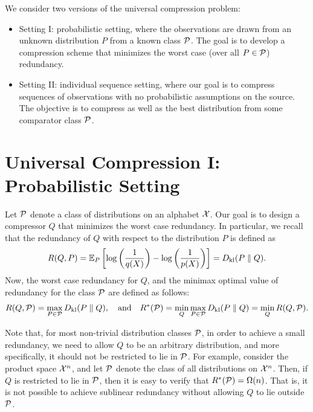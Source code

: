 
We consider two versions of the universal compression problem: 
\begin{itemize}
    \item Setting I: probabilistic setting, where the observations are drawn from an unknown distribution $P$ from a known class $\mathcal{P}$. The goal is to develop a compression scheme that minimizes the worst case (over all $P \in \mathcal{P}$) redundancy. 
    \item Setting II: individual sequence setting, where our goal is to compress sequences of observations with no probabilistic assumptions on the source. The objective is to compress as well as the best distribution  from some comparator class $\mathcal{P}$. 
\end{itemize}

\section{Universal Compression I: Probabilistic Setting}
\label{sec:universal-compression-probabilistic}
    Let $\mathcal{P}$ denote a class of distributions on an alphabet $\mathcal{X}$. Our goal is to design a compressor $Q$ that minimizes the worst case redundancy. In particular, we recall that the redundancy of $Q$ with respect to the distribution $P$ is defined as  
    \begin{align}
        R(Q, P) = \mathbb{E}_P \left[ \log \left( \frac{1}{q(X)} \right) - \log \left( \frac{1}{p(X)} \right) \right] = D_{\text{kl}}(P \parallel Q). 
    \end{align}
    Now, the worst case redundancy for $Q$, and the minimax optimal value of redundancy for the class $\mathcal{P}$ are defined as follows: 
    \begin{align}
        R(Q, \mathcal{P}) = \max_{P \in \mathcal{P}} D_{\text{kl}}(P \parallel Q), \quad \text{and} \quad R^*(\mathcal{P}) = \min_{Q} \max_{P \in \mathcal{P}} D_{\text{kl}}(P \parallel Q) = \min_{Q} R(Q, \mathcal{P}).  \label{eq:minimax-redundancy}
    \end{align}
    \begin{remark}
        \label{remark:class-of-Q} Note that, for most non-trivial distribution classes $\mathcal{P}$, in order to achieve a small redundancy, we need to allow $Q$ to be an arbitrary distribution, and more specifically, it should not be restricted to lie in $\mathcal{P}$. For example, consider the product space $\mathcal{X}^n$, and let $\mathcal{P}$ denote the class of all \iid distributions on $\mathcal{X}^n$. Then, if $Q$ is restricted to lie in $\mathcal{P}$, then it is easy to verify that $R^*(\mathcal{P}) = \Omega (n)$. 
        That is, it is not possible to achieve sublinear redundancy without allowing $Q$ to lie outside $\mathcal{P}$. 
    \end{remark}


